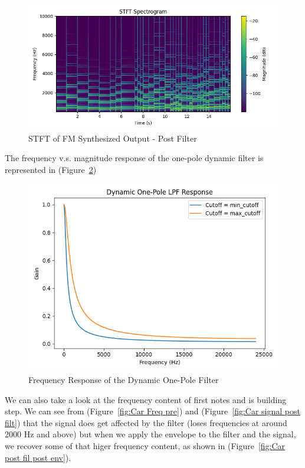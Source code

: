 \documentclass[11pt]{article}
\begin{document}
\begin{figure}[H]
    \centering
    \includegraphics[width=1\textwidth]{FM_Synth_out.png}
    \caption{STFT of FM Synthesized Output - Post Filter} %
    \label{fig:Fm Synth Out} %
\end{figure}

The frequency v.s. magnitude response of the one-pole dynamic filter is represented in (Figure~\ref{fig:Filter Response})

\begin{figure}[H]
    \centering
    \includegraphics[width=0.7 \textwidth]{Filter_Response_FM.png}
    \caption{Frequency Response of the Dynamic One-Pole Filter} %
    \label{fig:Filter Response} %
\end{figure}

We can also take a look at the frequency content of first notes and is building step. We can see from (Figure~\ref{fig:Car Freq pre}) and (Figure~\ref{fig:Car signal post filt}) that the signal does get affected by the filter (loses frequencies at around 2000 Hz and above) but when we apply the envelope to the filter and the signal, we recover some of that higer frequency content, as shown in (Figure~\ref{fig:Car post fil post env}).
\end{document}
